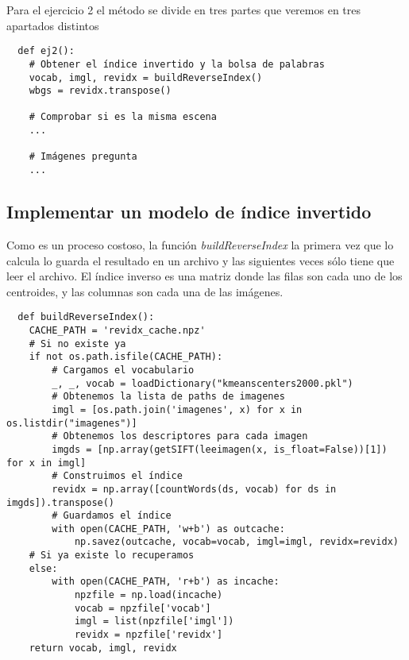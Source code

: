 \documentclass{article}
\begin{document}
Para el ejercicio 2 el método se divide en tres partes que veremos en tres apartados distintos

\begin{verbatim}
  def ej2():
    # Obtener el índice invertido y la bolsa de palabras
    vocab, imgl, revidx = buildReverseIndex()
    wbgs = revidx.transpose()
    
    # Comprobar si es la misma escena
    ...
    
    # Imágenes pregunta
    ...
\end{verbatim}

\subsection{Implementar un modelo de índice invertido}

Como es un proceso costoso, la función \textit{buildReverseIndex} la primera vez que lo calcula lo guarda el resultado en un archivo y las siguientes veces sólo tiene que leer el archivo. El índice inverso es una matriz donde las filas son cada uno de los centroides, y las columnas son cada una de las imágenes.

\begin{verbatim}
  def buildReverseIndex():
    CACHE_PATH = 'revidx_cache.npz'
    # Si no existe ya
    if not os.path.isfile(CACHE_PATH):
        # Cargamos el vocabulario
        _, _, vocab = loadDictionary("kmeanscenters2000.pkl")
        # Obtenemos la lista de paths de imagenes
        imgl = [os.path.join('imagenes', x) for x in os.listdir("imagenes")]
        # Obtenemos los descriptores para cada imagen
        imgds = [np.array(getSIFT(leeimagen(x, is_float=False))[1]) for x in imgl]
        # Construimos el índice
        revidx = np.array([countWords(ds, vocab) for ds in imgds]).transpose()
        # Guardamos el índice
        with open(CACHE_PATH, 'w+b') as outcache:
            np.savez(outcache, vocab=vocab, imgl=imgl, revidx=revidx)
    # Si ya existe lo recuperamos
    else:
        with open(CACHE_PATH, 'r+b') as incache:
            npzfile = np.load(incache)
            vocab = npzfile['vocab']
            imgl = list(npzfile['imgl'])
            revidx = npzfile['revidx']
    return vocab, imgl, revidx
\end{verbatim}
\end{document}
